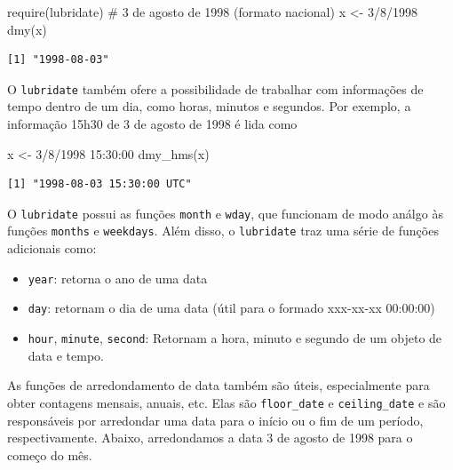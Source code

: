 \documentclass[
  letterpaper,
  DIV=11,
  numbers=noendperiod]{scrreprt}
\newenvironment{Shaded}{\begin{snugshade}}{\end{snugshade}}
\newcommand{\CommentTok}[1]{\textcolor[rgb]{0.37,0.37,0.37}{#1}}
\newcommand{\FunctionTok}[1]{\textcolor[rgb]{0.28,0.35,0.67}{#1}}
\newcommand{\NormalTok}[1]{\textcolor[rgb]{0.00,0.23,0.31}{#1}}
\newcommand{\OtherTok}[1]{\textcolor[rgb]{0.00,0.23,0.31}{#1}}
\newcommand{\StringTok}[1]{\textcolor[rgb]{0.13,0.47,0.30}{#1}}
\providecommand{\tightlist}{%
  \setlength{\itemsep}{0pt}\setlength{\parskip}{0pt}}\usepackage{longtable,booktabs,array}
\begin{document}
\begin{Shaded}
\begin{Highlighting}[]
\FunctionTok{require}\NormalTok{(lubridate)}
\CommentTok{\# 3 de agosto de 1998 (formato nacional)}
\NormalTok{x }\OtherTok{\textless{}{-}} \StringTok{\textquotesingle{}3/8/1998\textquotesingle{}}
\FunctionTok{dmy}\NormalTok{(x)}
\end{Highlighting}
\end{Shaded}

\begin{verbatim}
[1] "1998-08-03"
\end{verbatim}

O \texttt{lubridate} também ofere a possibilidade de trabalhar com
informações de tempo dentro de um dia, como horas, minutos e segundos.
Por exemplo, a informação 15h30 de 3 de agosto de 1998 é lida como

\begin{Shaded}
\begin{Highlighting}[]
\NormalTok{x }\OtherTok{\textless{}{-}} \StringTok{\textquotesingle{}3/8/1998 15:30:00\textquotesingle{}}
\FunctionTok{dmy\_hms}\NormalTok{(x)}
\end{Highlighting}
\end{Shaded}

\begin{verbatim}
[1] "1998-08-03 15:30:00 UTC"
\end{verbatim}

O \texttt{lubridate} possui as funções \texttt{month} e \texttt{wday},
que funcionam de modo análgo às funções \texttt{months} e
\texttt{weekdays}. Além disso, o \texttt{lubridate} traz uma série de
funções adicionais como:

\begin{itemize}
\tightlist
\item
  \texttt{year}: retorna o ano de uma data
\item
  \texttt{day}: retornam o dia de uma data (útil para o formado
  xxx-xx-xx 00:00:00)
\item
  \texttt{hour}, \texttt{minute}, \texttt{second}: Retornam a hora,
  minuto e segundo de um objeto de data e tempo.
\end{itemize}

As funções de arredondamento de data também são úteis, especialmente
para obter contagens mensais, anuais, etc. Elas são \texttt{floor\_date}
e \texttt{ceiling\_date} e são responsáveis por arredondar uma data para
o início ou o fim de um período, respectivamente. Abaixo, arredondamos a
data 3 de agosto de 1998 para o começo do mês.
\end{document}
